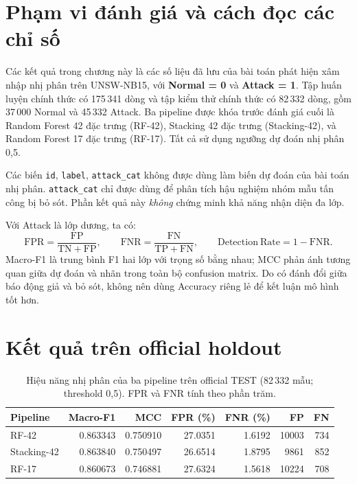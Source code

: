 


\section{Phạm vi đánh giá và cách đọc các chỉ số}
\label{sec:pham-vi-ket-qua}

Các kết quả trong chương này là các số liệu đã lưu của bài toán phát hiện xâm nhập nhị phân trên UNSW-NB15, với \textbf{Normal = 0} và \textbf{Attack = 1}. Tập huấn luyện chính thức có 175\,341 dòng và tập kiểm thử chính thức có 82\,332 dòng, gồm 37\,000 Normal và 45\,332 Attack. Ba pipeline được khóa trước đánh giá cuối là Random Forest 42 đặc trưng (RF-42), Stacking 42 đặc trưng (Stacking-42), và Random Forest 17 đặc trưng (RF-17). Tất cả sử dụng ngưỡng dự đoán nhị phân 0,5.

Các biến \texttt{id}, \texttt{label}, \texttt{attack\_cat} không được dùng làm biến dự đoán của bài toán nhị phân. \texttt{attack\_cat} chỉ được dùng để phân tích hậu nghiệm nhóm mẫu tấn công bị bỏ sót. Phần kết quả này \emph{không} chứng minh khả năng nhận diện đa lớp.

Với Attack là lớp dương, ta có:
\begin{equation}
  \mathrm{FPR}=\frac{\mathrm{FP}}{\mathrm{TN}+\mathrm{FP}},
  \qquad
  \mathrm{FNR}=\frac{\mathrm{FN}}{\mathrm{TP}+\mathrm{FN}},
  \qquad
  \mathrm{Detection\ Rate}=1-\mathrm{FNR}.
\end{equation}
Macro-F1 là trung bình F1 hai lớp với trọng số bằng nhau; MCC phản ánh tương quan giữa dự đoán và nhãn trong toàn bộ confusion matrix. Do có đánh đổi giữa báo động giả và bỏ sót, không nên dùng Accuracy riêng lẻ để kết luận mô hình tốt hơn.

\section{Kết quả trên official holdout}
\label{sec:ket-qua-official}

\begin{table}[htbp]
\centering
\small
\caption{Hiệu năng nhị phân của ba pipeline trên official TEST (82\,332 mẫu; threshold 0,5). FPR và FNR tính theo phần trăm.}
\label{tab:ket-qua-official}
\begin{tabular}{lrrrrrr}
\hline
Pipeline & Macro-F1 & MCC & FPR (\%) & FNR (\%) & FP & FN \\
\hline
RF-42       & 0.863343 & 0.750910 & 27.0351 & 1.6192 & 10003 & 734 \\
Stacking-42 & 0.863840 & 0.750497 & 26.6514 & 1.8795 & 9861 & 852 \\
RF-17       & 0.860673 & 0.746881 & 27.6324 & 1.5618 & 10224 & 708 \\
\hline
\end{tabular}
\end{table}

